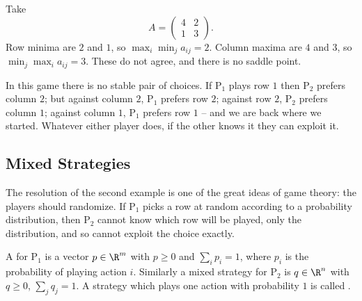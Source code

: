 \documentclass[a4paper]{scrartcl}
\begin{document}
\begin{example}
    Take
    $$
    A = \begin{pmatrix}4 & 2\\1&3\end{pmatrix}.
    $$
    Row minima are $2$ and $1$, so $\max_i\min_j a_{ij} = 2$. Column maxima are $4$ and $3$, so $\min_j\max_i a_{ij} = 3$. These do not agree, and there is no saddle point.

    In this game there is no stable pair of choices. If $\mathrm{P}_1$ plays row $1$ then $\mathrm{P}_2$ prefers column $2$; but against column $2$, $\mathrm{P}_1$ prefers row $2$; against row $2$, $\mathrm{P}_2$ prefers column $1$; against column $1$, $\mathrm{P}_1$ prefers row $1$ -- and we are back where we started. Whatever either player does, if the other knows it they can exploit it.
\end{example}

\subsection{Mixed Strategies}

The resolution of the second example is one of the great ideas of game theory: the players should randomize. If $\mathrm{P}_1$ picks a row at random according to a probability distribution, then $\mathrm{P}_2$ cannot know which row will be played, only the distribution, and so cannot exploit the choice exactly.

\begin{definition}
    A  for $\mathrm{P}_1$ is a vector $p \in \R^m$ with $p \geq 0$ and $\sum_i p_i = 1$, where $p_i$ is the probability of playing action $i$. Similarly a mixed strategy for $\mathrm{P}_2$ is $q \in \R^n$ with $q \geq 0$, $\sum_j q_j = 1$. A strategy which plays one action with probability $1$ is called .
\end{definition}
\end{document}

